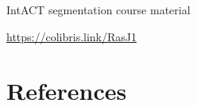 \documentclass[xcolor=pdftex,dvipsnames,table,mathserif]{beamer}
\begin{document}
\begin{frame}{IntACT segmentation course material}

\begin{block}{}
  \url{https://colibris.link/RasJ1}
\end{block}

\end{frame}




\section*{References}


\end{document}
